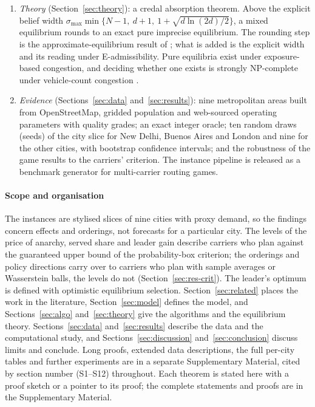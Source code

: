 \documentclass[preprint,11pt]{elsarticle}
\theoremstyle{definition}
\theoremstyle{remark}
\begin{document}
\begin{enumerate}[label=(\roman*),leftmargin=*,itemsep=0pt]
\item \emph{Theory} (Section~\ref{sec:theory}): a credal absorption theorem. Above the explicit belief width $\sigma_{\max}\min\{N-1,\ d+1,\ 1+\sqrt{d\ln(2d)/2}\}$, a mixed equilibrium rounds to an exact pure imprecise equilibrium. The rounding step is the approximate-equilibrium result of \citet{Liu2023}; what is added is the explicit width and its reading under E-admissibility. Pure equilibria exist under exposure-based congestion, and deciding whether one exists is strongly NP-complete under vehicle-count congestion \citep{Apt2022,Gottlob2005}.
\item \emph{Evidence} (Sections~\ref{sec:data} and~\ref{sec:results}): nine metropolitan areas built from OpenStreetMap, gridded population and web-sourced operating parameters with quality grades; an exact integer oracle; ten random draws (seeds) of the city slice for New Delhi, Buenos Aires and London and nine for the other cities, with bootstrap confidence intervals; and the robustness of the game results to the carriers' criterion. The instance pipeline is released as a benchmark generator for multi-carrier routing games.
\end{enumerate}

\paragraph{Scope and organisation} The instances are stylised slices of nine cities with proxy demand, so the findings concern effects and orderings, not forecasts for a particular city. The levels of the price of anarchy, served share and leader gain describe carriers who plan against the guaranteed upper bound of the probability-box criterion; the orderings and policy directions carry over to carriers who plan with sample averages or Wasserstein balls, the levels do not (Section~\ref{sec:res-crit}). The leader's optimum is defined with optimistic equilibrium selection. Section~\ref{sec:related} places the work in the literature, Section~\ref{sec:model} defines the model, and Sections~\ref{sec:algo} and~\ref{sec:theory} give the algorithms and the equilibrium theory. Sections~\ref{sec:data} and~\ref{sec:results} describe the data and the computational study, and Sections~\ref{sec:discussion} and~\ref{sec:conclusion} discuss limits and conclude. Long proofs, extended data descriptions, the full per-city tables and further experiments are in a separate Supplementary Material, cited by section number (S1--S12) throughout. Each theorem is stated here with a proof sketch or a pointer to its proof; the complete statements and proofs are in the Supplementary Material.
\end{document}
